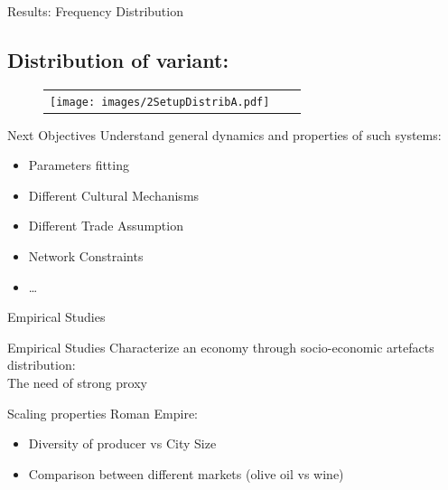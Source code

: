 \documentclass[12pt, notes=show]{beamer}
\begin{document}
\begin{frame}{Results: Frequency Distribution}
    \subsection*{Distribution of variant:}
    \begin{figure}[!h]
	\begin{center}
	    \begin{tabular}{ccc}
		\texttt{[image: images/2SetupDistribA.pdf]}\\
	    \end{tabular}

	\end{center}
    \end{figure}
\end{frame}

\begin{frame}{Next Objectives}
    \vfill
    Understand general dynamics and properties of such systems:
    \vfill
	\begin{itemize}
	\item Parameters fitting
    \vfill
	\item Different Cultural Mechanisms
    \vfill
	\item Different Trade Assumption
    \vfill
	\item Network Constraints
    \vfill
	\item \dots
    \vfill
	\end{itemize}
\end{frame}

\begin{frame}
    \centering
    \Large
   Empirical Studies 
\end{frame}
\begin{frame}{Empirical Studies}
	Characterize an economy through socio-economic artefacts distribution:\\
	\hspace{1cm} The need of strong proxy
\end{frame}

\begin{frame}{Scaling properties}
    Roman Empire:
    \begin{itemize}
	\item Diversity of producer vs City Size 
	\item Comparison between different markets (olive oil vs wine)
    \end{itemize}
\end{frame}
\end{document}
